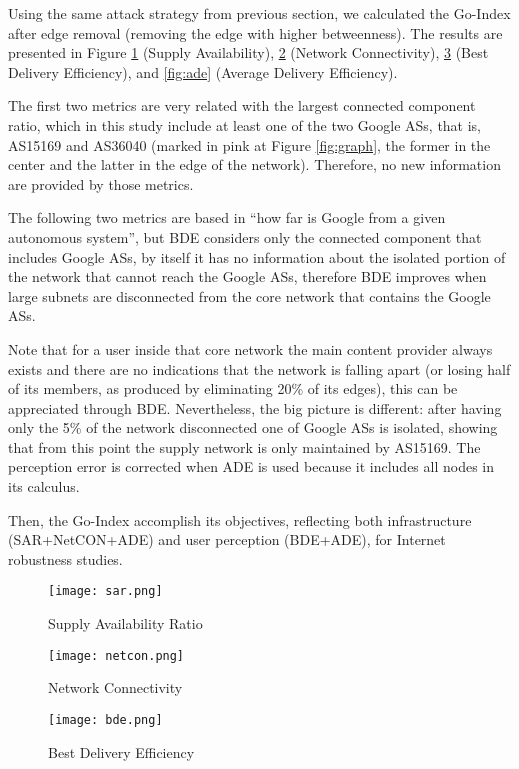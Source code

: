 \documentclass{sig-alternate-10pt}
\begin{document}
Using the same attack strategy from previous section, we calculated the Go-Index after edge removal (removing the edge with higher betweenness). The results are presented in Figure \ref{fig:sar} (Supply Availability), \ref{fig:netcon} (Network Connectivity), \ref{fig:bde} (Best Delivery Efficiency), and \ref{fig:ade} (Average Delivery Efficiency).  

The first two metrics are very related with the largest connected component ratio, which in this study include at least one of the two Google ASs, that is, AS15169 and AS36040 (marked in pink at Figure \ref{fig:graph}, the former in the center and the latter in the edge of the network).  Therefore, no new information are provided by those metrics.

The following two metrics are based  in ``how far is Google from a given autonomous system'', but  BDE considers only the connected component that includes Google ASs, by itself it has no information about the isolated portion of the network that cannot reach the Google ASs, therefore BDE improves when large subnets are disconnected from the core network that contains the Google ASs.  

Note that for a user inside that core network the main content provider always exists and there are no indications that the network is falling apart (or losing half of its members, as produced by eliminating 20\% of its edges), this can be appreciated through BDE. Nevertheless, the big picture is different: after having only the 5\% of the network disconnected one of Google ASs is isolated, showing that from this point the supply network is only maintained by AS15169. The perception error is corrected when ADE is used because it includes all nodes in its calculus.

Then, the Go-Index accomplish its objectives, reflecting both infrastructure (SAR+NetCON+ADE) and user perception (BDE+ADE), for Internet robustness studies.

\begin{figure}[th!]
  \centering
  \texttt{[image: sar.png]}
  \caption{Supply Availability Ratio}
  \label{fig:sar}
\end{figure}

\begin{figure}[th!]
  \centering
  \texttt{[image: netcon.png]}
  \caption{Network Connectivity}
  \label{fig:netcon}
\end{figure}

\begin{figure}[th!]
  \centering
  \texttt{[image: bde.png]}
  \caption{Best Delivery Efficiency}
  \label{fig:bde}
\end{figure}
\end{document}

